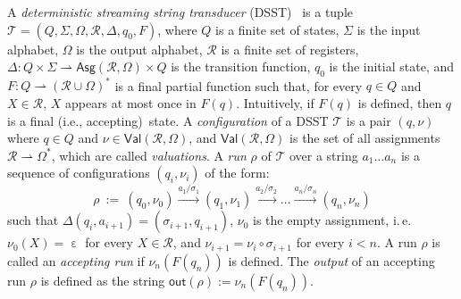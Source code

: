 \documentclass[
a4paper
]{article}
\theoremstyle{plain}
\theoremstyle{definition}
\theoremstyle{remark}
\DeclareMathOperator{\eword}{\varepsilon}
\newcommand{\pmap}{\rightharpoonup}
\newcommand{\Reg}{\mathcal{R}}
\newcommand{\Asg}{\operatorname{Asg}}
\newcommand{\Val}{\operatorname{Val}}
\newcommand{\nsst}{\mathcal{T}}
\newcommand{\out}{\operatorname{out}}
\renewcommand{\operatorname}[1]{\textsf{#1}}
\begin{document}
A \emph{deterministic streaming string transducer} (DSST)~\cite{AlurC10} is a tuple
$
\nsst = (Q, \Sigma, \Omega,  \Reg, \Delta, q_0, F)$,
where $Q$ is a finite set of states, $\Sigma$ is the input alphabet, $\Omega$ is the output alphabet, $\Reg$ is a finite set of registers, $\Delta \colon Q \times \Sigma \pmap \Asg(\Reg, \Omega) \times Q$ is the transition function, $q_0$ is the initial state, and $F: Q \pmap (\Reg \cup \Omega)^*$ is a final partial function such that, for every $q \in Q$ and $X \in \Reg$, $X$ appears at most once in $F(q)$.
Intuitively, if $F(q)$ is defined, then $q$ is a final
(i.e., accepting)~state.
A \emph{configuration} of a DSST $\nsst$
is a pair $(q, \nu)$ where $q \in Q$ and $\nu \in \Val(\Reg, \Omega)$, and $\Val(\Reg, \Omega)$ is the set of all assignments $\Reg \pmap \Omega^*$, which are called \emph{valuations}.
A \emph{run} $\rho$ of $\nsst$ over a string $a_1 \ldots a_n$ is a sequence of configurations $(q_i, \nu_i)$ of the form:
\begin{equation*}
	\rho \ := \ (q_0, \nu_0) \xrightarrow{a_1/\sigma_1} (q_1, \nu_1) \xrightarrow{a_2 /\sigma_2} \ldots \xrightarrow{a_n/\sigma_{n}} (q_{n}, \nu_n)
\end{equation*}
such that $\Delta(q_i, a_{i+1}) = (\sigma_{i+1}, q_{i+1})$, $\nu_{0}$ is the empty assignment, i.\,e. $\nu_{0}(X) = \eword$ for every $X \in \Reg$, and $\nu_{i+1} = \nu_i \circ \sigma_{i+1}$ for every $i < n$.
A run $\rho$ is called
an \emph{accepting run} if $\nu_n(F(q_n))$ is defined.
The
\emph{output} of an accepting run $\rho$
is defined
as the string $\out(\rho) := \nu_n(F(q_n))$. 
\end{document}
